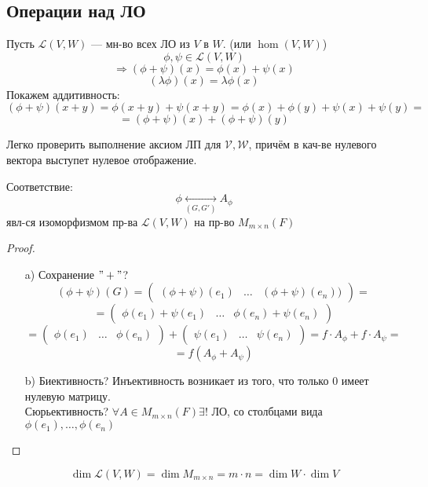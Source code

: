 \subsection{Операции над ЛО}
Пусть $\mathcal{L}(V, W)$ --- мн-во всех ЛО из $V$ в $W$. (или $\hom(V, W)$)
\[
\phi, \psi \in \mathcal{L}(V, W)
\]
\[
 \Rightarrow (\phi + \psi)(x) = \phi(x) + \psi(x)
\]
\[
   (\lambda \phi)(x) = \lambda \phi(x)
\]
Покажем аддитивность:
\[
  (\phi + \psi)(x + y) = \phi(x + y) + \psi(x + y) = \phi(x) + \phi(y) + \psi(x) + \psi(y) = 
\]
\[
 = (\phi + \psi)(x) + (\phi + \psi)(y)
\]
\begin{note}
Легко проверить выполнение аксиом ЛП для $\mathcal{V, W}$, причём в кач-ве нулевого вектора выступет нулевое отображение.
\end{note}

\begin{statement}
  Соответствие:
\[
\phi \underset{(G, G')}{\longleftrightarrow} A_\phi
\]
явл-ся изоморфизмом пр-ва $\mathcal{L}(V, W)$ на пр-во $M_{m \times n}(F)$
\end{statement}
\begin{proof}
\begin{itemize}
  \item [a) ] Сохранение $"+"$?
    \[
      (\phi + \psi)(G) = \begin{pmatrix} (\phi + \psi)(e_1) & \ldots & (\phi + \psi)(e_n)) \end{pmatrix} = 
    \]
    \[
    = \begin{pmatrix}\phi(e_1) + \psi(e_1) & \ldots & \phi(e_n) + \psi(e_n) \end{pmatrix}
    \]
    \[
      = \begin{pmatrix}\phi(e_1) & \ldots & \phi(e_n) \end{pmatrix} + \begin{pmatrix}\psi(e_1) & \ldots & \psi(e_n) \end{pmatrix} = f \cdot A_\phi + f \cdot A_\psi = 
    \]
    \[
     = f (A_\phi + A_\psi)
    \]
  \item [b) ] Биективность? Инъективность возникает из того, что только $0$ имеет нулевую матрицу. \\
    Сюрьективность? $\forall A \in M_{m \times n} (F) \exists!$ ЛО, со столбцами вида $\phi(e_1), \ldots, \phi(e_n)$
\end{itemize}
\end{proof}
\begin{consequence}
\[
\dim \mathcal{L}(V, W) = \dim M_{m \times n} = m \cdot n = \dim W \cdot \dim V
\]
\end{consequence}
